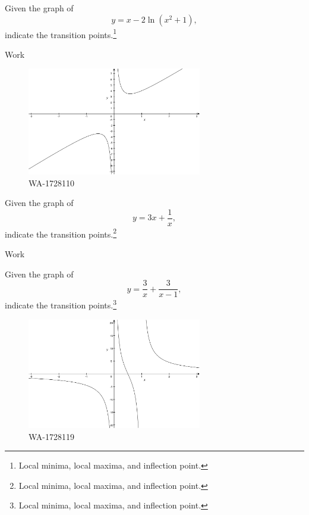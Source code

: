 \documentclass[12pt,addpoints, answers, fleqn]{exam}
\begin{document}
\begin{teacher}
\begin{questions}
Given the graph of
\[
y = x - 2\ln \left(x^2 + 1\right),
\]
indicate the transition points.\footnote{Local minima, local maxima, and inflection point.}


\begin{solution}
Work
\end{solution}

\question 	%

\begin{figure}[htbp] %
   \centering
   \includegraphics[width=3in]{./graphics/1728110.pdf} 
   \caption{WA-1728110}
   \label{fig:1728110}
\end{figure}

Given the graph of
\[
y = 3x + \frac{1}{x},
\]
indicate the transition points.\footnote{Local minima, local maxima, and inflection point.}


\begin{solution}
Work
\end{solution}

\question 	%

Given the graph of
\[
y = \frac{3}{x} + \frac{3}{x-1},
\]
indicate the transition points.\footnote{Local minima, local maxima, and inflection point.}

\begin{figure}[htbp] %
   \centering
   \includegraphics[width=3in]{./graphics/1728119.pdf} 
   \caption{WA-1728119}
   \label{fig:1728119}
\end{figure}


\end{questions}
\end{teacher}
\end{document}
